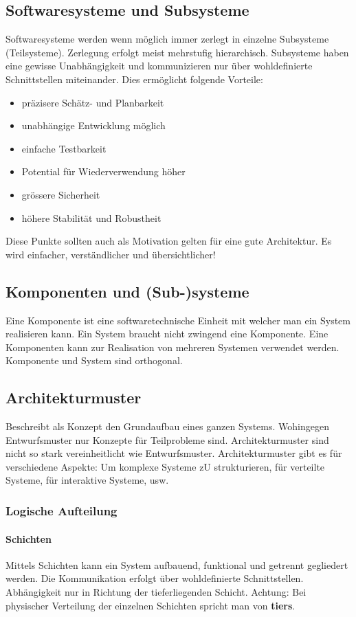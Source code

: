 \subsection{Softwaresysteme und Subsysteme}
Softwaresysteme werden wenn möglich immer zerlegt in einzelne Subsysteme (Teilsysteme). Zerlegung erfolgt meist mehrstufig hierarchisch. Subsysteme haben eine gewisse Unabhängigkeit und kommunizieren nur über wohldefinierte Schnittstellen miteinander. Dies ermöglicht folgende Vorteile:
\begin{itemize}
	\item präzisere Schätz- und Planbarkeit
	\item unabhängige Entwicklung möglich
	\item einfache Testbarkeit
	\item Potential für Wiederverwendung höher
	\item grössere Sicherheit
	\item höhere Stabilität und Robustheit
\end{itemize}
Diese Punkte sollten auch als Motivation gelten für eine gute Architektur. Es wird einfacher, verständlicher und übersichtlicher!

\subsection{Komponenten und (Sub-)systeme}
Eine Komponente ist eine softwaretechnische Einheit mit welcher man ein System realisieren kann. Ein System braucht nicht zwingend eine Komponente. Eine Komponenten kann zur Realisation von mehreren Systemen verwendet werden. Komponente und System sind orthogonal.


\subsection{Architekturmuster}
Beschreibt als Konzept den Grundaufbau eines ganzen Systems. Wohingegen Entwurfsmuster nur Konzepte für Teilprobleme sind. Architekturmuster sind nicht so stark vereinheitlicht wie Entwurfsmuster. Architekturmuster gibt es für verschiedene Aspekte: Um komplexe Systeme zU strukturieren, für verteilte Systeme, für interaktive Systeme, usw.

\subsubsection{Logische Aufteilung}
\paragraph{Schichten} Mittels Schichten kann ein System aufbauend, funktional und getrennt gegliedert werden. Die Kommunikation erfolgt über wohldefinierte Schnittstellen. Abhängigkeit nur in Richtung der tieferliegenden Schicht. Achtung: Bei physischer Verteilung der einzelnen Schichten spricht man von \textbf{tiers}.

